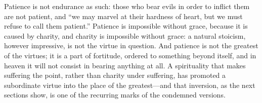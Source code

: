 Patience is not endurance as such: those who bear evils in order to inflict them are not patient, and ``we may marvel at their hardness of heart, but we must refuse to call them patient.'' Patience is impossible without grace, because it is caused by charity, and charity is impossible without grace: a natural stoicism, however impressive, is not the virtue in question. And patience is not the greatest of the virtues; it is a part of fortitude, ordered to something beyond itself, and in heaven it will not consist in bearing anything at all. A spirituality that makes suffering the point, rather than charity under suffering, has promoted a subordinate virtue into the place of the greatest---and that inversion, as the next sections show, is one of the recurring marks of the condemned versions.
